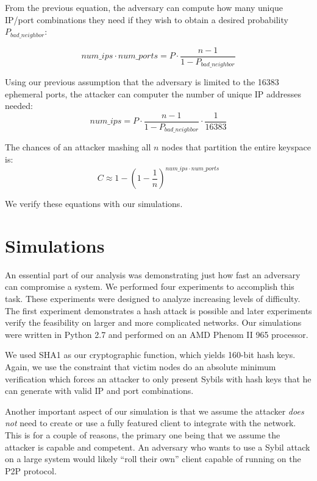 \documentclass[11pt,conference]{IEEEtran}
\begin{document}
From the previous equation, the adversary can compute how many unique IP/port combinations they need if they wish to obtain a desired probability $P_{bad\_neighbor}$:

$$ num\_ips \cdot num\_ports = P \cdot \frac{n - 1}{1 - P_{bad\_neighbor} }$$

Using our previous assumption that the adversary is limited to the 16383 ephemeral ports, the attacker can computer the number of unique IP addresses needed:
$$ num\_ips  =  P \cdot \frac{n - 1}{1 - P_{bad\_neighbor} }  \cdot \frac{1}{16383}$$

The chances of an attacker mashing all $n$ nodes that partition the entire keyspace is:
$$C \approx  1 - (1 -\frac{1}{n})^{num\_ips \cdot num\_ports}  $$

We verify these equations with our simulations.

\section{Simulations}
\label{sec:experiments}
An essential part of our analysis was demonstrating just how fast an adversary can compromise a system.
We performed four experiments to accomplish this task.
These experiments were designed to analyze increasing levels of difficulty.
The first experiment demonstrates a hash attack is possible and later experiments verify the feasibility on larger and more complicated networks.
Our simulations were written in Python 2.7 and performed on an AMD Phenom II 965 processor. %

We used SHA1 as our cryptographic function, which yields 160-bit hash keys.
Again, we use the constraint that victim nodes do an absolute minimum verification which forces an attacker to only present Sybils with hash keys that he can generate with valid IP and port combinations.


Another important aspect of our simulation is that we assume the attacker \textit{does not }need to create or use a fully featured client to integrate with the network.
This is for a couple of reasons, the primary one being that we assume the attacker is capable and competent.
An adversary who wants to use a Sybil attack on a large system would likely ``roll their own'' client capable of running on the P2P protocol.
\end{document}
